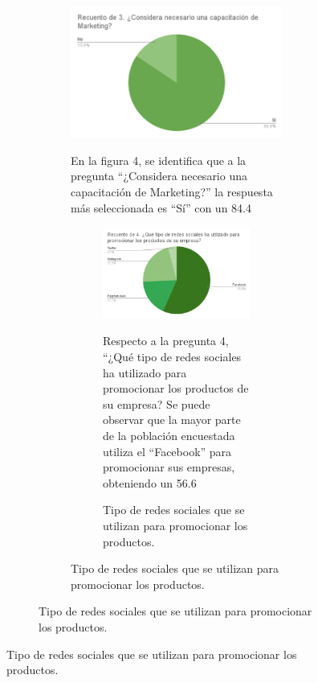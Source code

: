 \documentclass[12pt]{difu100cia} %
\begin{document}
\begin{figure}[!htb]
\begin{figure}[!htb]
\begin{figure}[!htb]
	\centering
	\includegraphics[width=\linewidth]{Figura 4.png}
	\caption{Necesidad de capacitación en Marketing}
	\label{diagrama_bloque_rfnoc}
	
En la figura 4, se identifica que a la pregunta “¿Considera necesario una capacitación de Marketing?” la respuesta más seleccionada es “Sí” con un 84.4%

\begin{figure}[!htb]
	\centering
	\includegraphics[width=\linewidth]{Figura 5.png}
	\caption{Tipo de redes sociales que se utilizan para promocionar los productos.}
	\label{diagrama_bloque_rfnoc}
	
Respecto a la pregunta 4, “¿Qué tipo de redes sociales ha utilizado para promocionar los productos de su empresa?  Se puede observar que la mayor parte de la población encuestada utiliza el “Facebook” para promocionar sus empresas, obteniendo un 56.6%


\end{figure}
\end{figure}
\end{figure}
\end{figure}
\end{document}
